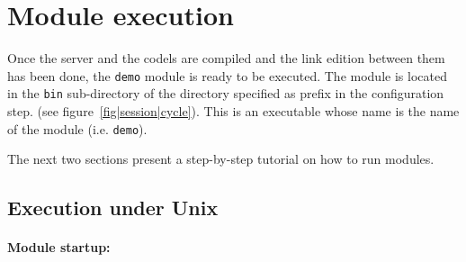\section{Module execution}
\label{sec|session|exec}

Once the server and the codels are compiled and  the link edition between
them has been done,  the \texttt{demo} module is  ready to be executed.  The
module is located in the  \texttt{bin} sub-directory of the directory
specified as prefix in the 
configuration step.     (see
figure~\ref{fig|session|cycle}). This is an executable whose name is
the   name   of the     module  (i.e. \texttt{demo}).

The   next two sections   present a step-by-step   tutorial on how to run
modules.

\subsection{Execution under Unix}
\label{ssec|exec|unix}

\paragraph{Module startup:}

